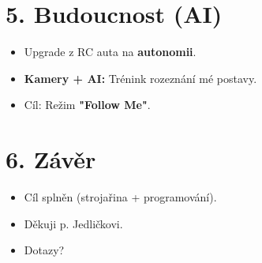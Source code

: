 \documentclass[12pt,a4paper]{article}
\begin{document}
\section*{5. Budoucnost (AI)}
\begin{itemize}[itemsep=0.5em, label=$\rightarrow$]
    \item Upgrade z RC auta na \textbf{autonomii}.
    \item \textbf{Kamery + AI:} Trénink rozeznání mé postavy.
    \item Cíl: Režim \textbf{"Follow Me"}.
\end{itemize}

\section*{6. Závěr}
\begin{itemize}[itemsep=0.5em, label=$\rightarrow$]
    \item Cíl splněn (strojařina + programování).
    \item Děkuji p. Jedličkovi.
    \item Dotazy?
\end{itemize}
\end{document}
